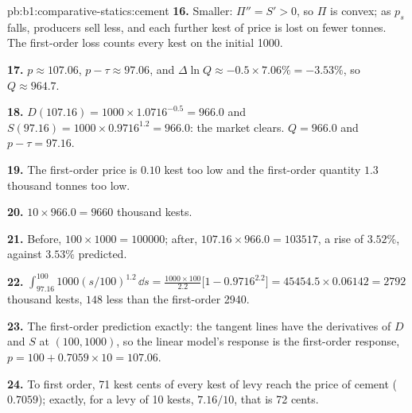 \begin{solution}{pb:b1:comparative-statics:cement}
\textbf{16.} Smaller: $\Pi'' = S' > 0$, so $\Pi$ is convex; as $p_s$ falls,
producers sell less, and each further kest of price is lost on fewer
tonnes. The first-order loss counts every kest on the initial 1000.

\textbf{17.} $p \approx 107.06$, $p - \tau \approx 97.06$, and
$\Delta\ln Q \approx -0.5 \times 7.06\% = -3.53\%$, so $Q \approx 964.7$.

\textbf{18.} $D(107.16) = 1000 \times 1.0716^{-0.5} = 966.0$ and
$S(97.16) = 1000 \times 0.9716^{1.2} = 966.0$: the market clears. $Q = 966.0$
and $p - \tau = 97.16$.

\textbf{19.} The first-order price is $0.10$ kest too low and the first-order
quantity $1.3$ thousand tonnes too low.

\textbf{20.} $10 \times 966.0 = 9660$ thousand kests.

\textbf{21.} Before, $100 \times 1000 = 100000$; after, $107.16 \times 966.0 =
103517$, a rise of $3.52\%$, against $3.53\%$ predicted.

\textbf{22.} $\int_{97.16}^{100} 1000(s/100)^{1.2}\,\dd s = \frac{1000 \times 100}{2.2}
\bigl[1 - 0.9716^{2.2}\bigr] = 45454.5 \times 0.06142 = 2792$ thousand kests,
$148$ less than the first-order 2940.

\textbf{23.} The first-order prediction exactly: the tangent lines have the
derivatives of $D$ and $S$ at $(100, 1000)$, so the linear model's response is
the first-order response, $p = 100 + 0.7059 \times 10 = 107.06$.

\textbf{24.} To first order, 71 kest cents of every kest of levy reach the
price of cement ($0.7059$); exactly, for a levy of 10 kests, $7.16/10$, that is
72 cents.
\end{solution}
